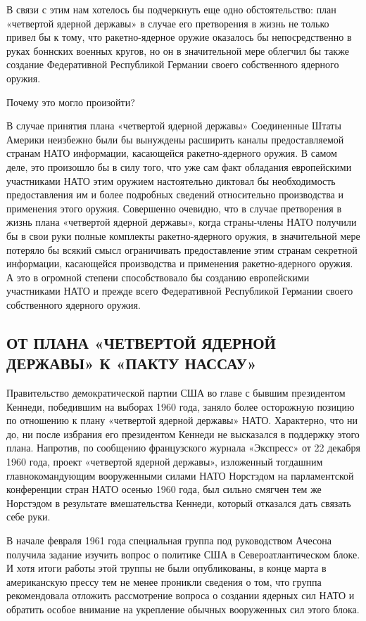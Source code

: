 \documentclass[12pt, a4paper, openany]{book}
\begin{document}
В связи с этим нам хотелось бы подчеркнуть еще одно обстоятельство: план «четвертой ядерной державы» в случае его претворения в жизнь не только привел бы к тому, что ракетно-ядерное оружие оказалось бы непосредственно в руках боннских военных кругов, но он в значительной мере облегчил бы также создание Федеративной Республикой Германии своего собственного ядерного оружия.
	
Почему это могло произойти?
	
В случае принятия плана «четвертой ядерной державы» Соединенные Штаты Америки неизбежно были бы вынуждены расширить каналы предоставляемой странам НАТО информации, касающейся ракетно-ядерного оружия. В самом деле, это произошло бы в силу того, что уже сам факт обладания европейскими участниками НАТО этим оружием настоятельно диктовал бы необходимость предоставления им и более подробных сведений относительно производства и применения этого оружия. Совершенно очевидно, что в случае претворения в жизнь плана «четвертой ядерной державы», когда страны-члены НАТО получили бы в свои руки полные комплекты ракетно-ядерного оружия, в значительной мере потеряло бы всякий смысл ограничивать предоставление этим странам секретной информации, касающейся производства и применения ракетно-ядерного оружия. А это в огромной степени способствовало бы созданию европейскими участниками НАТО и прежде всего Федеративной Республикой Германии своего собственного ядерного оружия.
	
\subsection[От плана «четвертой ядерной державы» к «пакту Нассау»]{\center ОТ ПЛАНА «ЧЕТВЕРТОЙ ЯДЕРНОЙ ДЕРЖАВЫ» К «ПАКТУ НАССАУ»}

	
Правительство демократической партии США во главе с бывшим президентом Кеннеди, победившим на выборах 1960 года, заняло более осторожную позицию по отношению к плану «четвертой ядерной державы» НАТО. Характерно, что ни до, ни после избрания его президентом Кеннеди не высказался в поддержку этого плана. Напротив, по сообщению французского журнала «Экспресс» от 22 декабря 1960 года, проект «четвертой ядерной державы», изложенный тогдашним главнокомандующим вооруженными силами НАТО Норстэдом на парламентской конференции стран НАТО осенью 1960 года, был сильно смягчен тем же Норстэдом в результате вмешательства Кеннеди, который отказался дать связать себе руки.
	
В начале февраля 1961 года специальная группа под руководством Ачесона получила задание изучить вопрос о политике США в Североатлантическом блоке. И хотя итоги работы этой труппы не были опубликованы, в конце марта в американскую прессу тем не менее проникли сведения о том, что группа рекомендовала отложить рассмотрение вопроса о создании ядерных сил НАТО и обратить особое внимание на укрепление обычных вооруженных сил этого блока.
	
\end{document}
